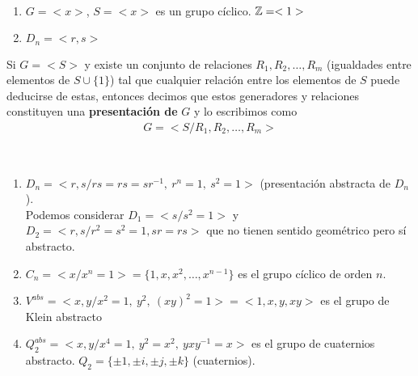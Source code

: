 \begin{ejemplo}\
    \begin{enumerate}
        \item $G=<x>$, $S=<x>$ es un grupo cíclico. $\mathbb{Z}=<1>$
        \item $D_n=<r,s>$
    \end{enumerate}
\end{ejemplo}

\begin{definicion}
    Si $G=<S>$ y existe un conjunto de relaciones $R_1,R_2,\dots,R_m$ (igualdades entre elementos de $S\cup\{1\}$) tal que cualquier relación entre los elementos de $S$ puede deducirse de estas, entonces decimos que estos generadores y relaciones constituyen una \textbf{presentación de} $G$ y lo escribimos como
    \begin{align*}
        G=<S /R_1,R_2,\dots,R_m>
    \end{align*}
\end{definicion}

\begin{ejemplo}\
    \begin{enumerate}
        \item $D_n=<r,s /rs=rs=sr^{-1},\ r^n=1,\ s^2=1>$ (presentación abstracta de $D_n$).\\ 
        Podemos considerar $D_1=<s/s^2=1>$ y $D_2=<r,s / r^2=s^2=1, sr=rs>$ que no tienen sentido geométrico pero sí abstracto.

        \item $C_n=<x / x^n=1>=\{1,x,x^2,\dots,x^{n-1}\}$ es el grupo cíclico de orden $n$.
        \item $V^{abs} = <x,y / x^2=1,\ y^2,\ (xy)^2=1>=<1,x,y,xy>$ es el grupo de Klein abstracto
        \item $Q_2^{abs} = <x,y/x^4=1,\ y^2=x^2,\ yxy^{-1}=x>$ es el grupo de cuaternios abstracto. $Q_2=\{\pm 1, \pm i, \pm j, \pm k\}$ (cuaternios).
    \end{enumerate}
\end{ejemplo}
